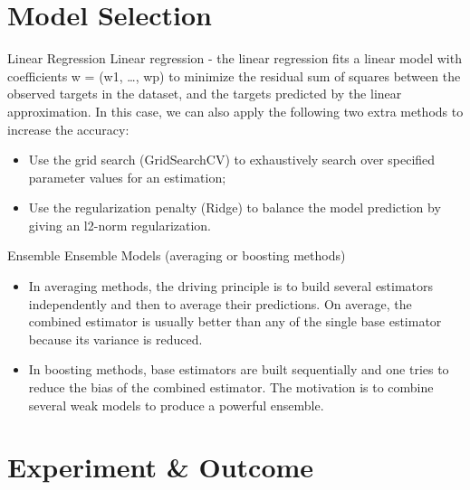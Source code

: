 \documentclass[
 size=14pt,
 paper=smartboard,  %
 mode=present, 		%
 display=slides, 	%
 style=tuliplab,  	%
 pauseslide,
 fleqn,leqno]{powerdot}
\begin{document}
\section{Model Selection}


\begin{slide}{Linear Regression}
Linear regression - the linear regression fits a linear model with coefficients w = (w1, …, wp) to minimize the residual sum of squares between the observed targets in the dataset, and the targets predicted by the linear approximation. In this case, we can also apply the following two extra methods to increase the accuracy: 
    \begin{itemize}
    \item Use the grid search (GridSearchCV) to exhaustively search over specified parameter values for an estimation; 
    \item Use the regularization penalty (Ridge) to balance the model prediction by giving an l2-norm regularization.
    \end{itemize}
\end{slide}
\begin{slide}{Ensemble}
Ensemble Models (averaging or boosting methods) 
    \begin{itemize}
    \item In averaging methods, the driving principle is to build several estimators independently and then to average their predictions. On average, the combined estimator is usually better than any of the single base estimator because its variance is reduced. 
    \item In boosting methods, base estimators are built sequentially and one tries to reduce the bias of the combined estimator. The motivation is to combine several weak models to produce a powerful ensemble.
    \end{itemize}
\end{slide}

\section{Experiment \& Outcome}
\end{document}
